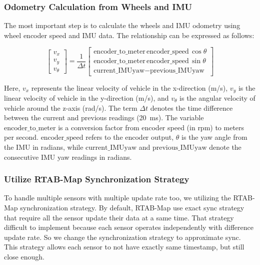 \documentclass[conference, a4paper]{IEEEtran}[2015/08/26]
\begin{document}
\subsubsection{Odometry Calculation from Wheels and IMU}
The most important step is to calculate the wheels and IMU odometry using wheel encoder speed and IMU data. The relationship can be expressed as follows:

\begin{equation}
	\begin{bmatrix}
	v_x \\
	v_y \\
	v_\theta
	\end{bmatrix}
	=
	\dfrac{1}{\Delta t}
	\begin{bmatrix}
	\text{encoder\_to\_meter}\,\text{encoder\_speed}\,\cos\theta \\
	\text{encoder\_to\_meter}\,\text{encoder\_speed}\,\sin\theta \\
	\text{current\_IMUyaw}-\text{previous\_IMUyaw}
	\end{bmatrix}
	\label{eq:velocity_matrix_explicit}
\end{equation}

Here, $v_x$ represents the linear velocity of vehicle in the x-direction (m/s), $v_y$ is the linear velocity of vehicle in the y-direction (m/s), and $v_\theta$ is the angular velocity of vehicle around the z-axis (rad/s). The term $\Delta t$ denotes the time difference between the current and previous readings (20~ms). The variable $\text{encoder\_to\_meter}$ is a conversion factor from encoder speed (in rpm) to meters per second. $\text{encoder\_speed}$ refers to the encoder output, $\theta$ is the yaw angle from the IMU in radians, while $\text{current\_IMUyaw}$ and $\text{previous\_IMUyaw}$ denote the consecutive IMU yaw readings in radians.

\subsubsection{Utilize RTAB-Map Synchronization Strategy}
To handle multiple sensors with multiple update rate too, we utilizing the RTAB-Map synchronization strategy. By default, RTAB-Map use exact sync strategy that require all the sensor update their data at a same time. That strategy difficult to implement because each sensor operates independently with difference update rate. So we change the synchronization strategy to approximate sync. This strategy allows each sensor to not have exactly same timestamp, but still close enough. 
\end{document}

